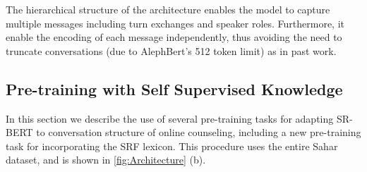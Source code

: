 \documentclass[letterpaper]{article} %
\newcommand{\kibitz}[2]{\ifnum\Comments=1{\textcolor{#1}{#2}}\fi}
\newcommand{\kg}[1]{\kibitz{red}{[KG:#1]}}
\newcommand{\di}[1]{\kibitz{blue}{[DI:#1]}}
\begin{document}
The hierarchical structure of the architecture enables the model to capture multiple messages including turn exchanges and speaker roles. Furthermore, it enable the encoding of each message independently, thus avoiding the need to truncate conversations (due to  AlephBert's 512 token limit) as in past work.




\subsection{Pre-training with  Self Supervised Knowledge}
In this section we describe the use of several pre-training tasks for adapting SR-BERT to conversation structure of online counseling, including a  new pre-training task for   incorporating the SRF lexicon. This procedure uses the entire Sahar dataset, and is shown in \autoref{fig:Architecture} (b). 
\end{document}
